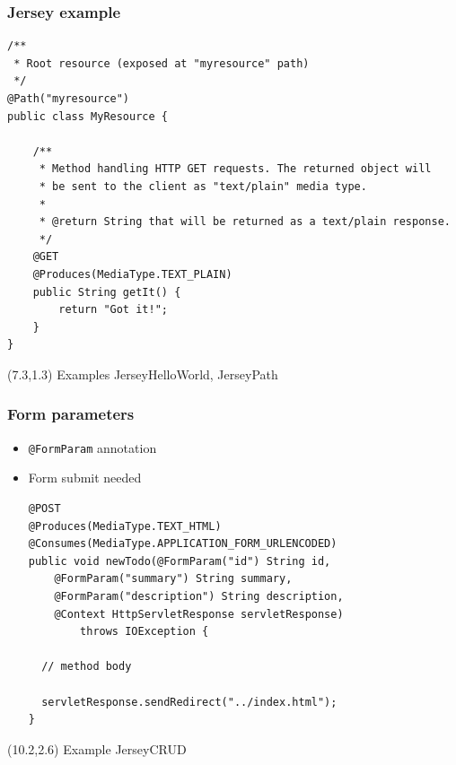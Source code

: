 \documentclass[10pt,xcolor=pdflatex]{beamer}
\begin{document}
\begin{frame}[containsverbatim]\frametitle{Jersey example}
\begin{footnotesize}
\begin{verbatim}
/**
 * Root resource (exposed at "myresource" path)
 */
@Path("myresource")
public class MyResource {
 
    /**
     * Method handling HTTP GET requests. The returned object will 
     * be sent to the client as "text/plain" media type.
     *
     * @return String that will be returned as a text/plain response.
     */
    @GET
    @Produces(MediaType.TEXT_PLAIN)
    public String getIt() {
        return "Got it!";
    }
}
\end{verbatim}
\end{footnotesize}
\begin{textblock}{7}(7.3,1.3)
    {\footnotesize Examples JerseyHelloWorld, JerseyPath}
\end{textblock}
\end{frame}


\begin{frame}[containsverbatim]\frametitle{Form parameters}
\begin{itemize}
	\item \texttt{@FormParam} annotation
	\item Form submit needed
	\begin{footnotesize}
	\begin{verbatim}
@POST
@Produces(MediaType.TEXT_HTML)
@Consumes(MediaType.APPLICATION_FORM_URLENCODED)
public void newTodo(@FormParam("id") String id,
    @FormParam("summary") String summary,
    @FormParam("description") String description,
    @Context HttpServletResponse servletResponse) 
        throws IOException {
  
  // method body
  
  servletResponse.sendRedirect("../index.html");
}
	\end{verbatim}
	\end{footnotesize}
\end{itemize}
\begin{textblock}{5}(10.2,2.6)
    {\footnotesize Example JerseyCRUD}
\end{textblock}
\end{frame}
\end{document}
